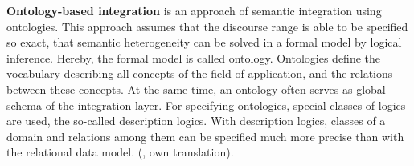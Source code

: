 \textbf{Ontology-based integration} is an approach of semantic integration using ontologies. This approach assumes that the discourse range is able to be specified so exact, that semantic heterogeneity can be solved in a formal model by logical inference. Hereby, the formal model is called ontology. Ontologies define the vocabulary describing all concepts of the field of application, and the relations between these concepts. At the same time, an ontology often serves as global schema of the integration layer. For specifying ontologies, special classes of logics are used, the so-called description logics. With description logics, classes of a domain and relations among them can be specified much more precise than with the relational data model. (\cite[p. 267]{DBLP:books/dp/LeserN2006}, own translation).\\